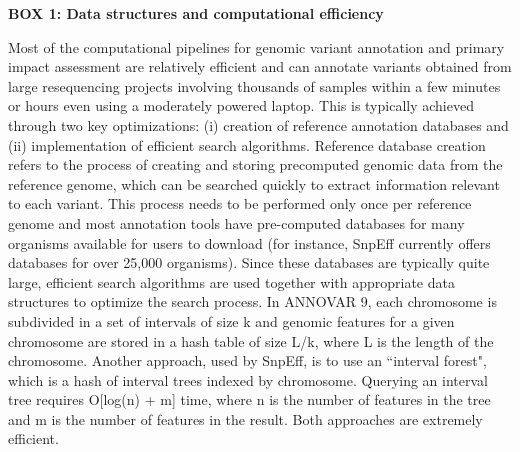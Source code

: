 \textbf{BOX 1: Data structures and computational efficiency}
\begin{framed}
Most of the computational pipelines for genomic variant annotation and primary impact assessment are relatively efficient and can annotate variants obtained from large resequencing projects involving thousands of samples within a few minutes or hours even using a moderately powered laptop. This is typically achieved through two key optimizations: (i) creation of reference annotation databases and (ii) implementation of efficient search algorithms. Reference database creation refers to the process of creating and storing precomputed genomic data from the reference genome, which can be searched quickly to extract information relevant to each variant. This process needs to be performed only once per reference genome and most annotation tools have pre-computed databases for many organisms available for users to download (for instance, SnpEff currently offers databases for over 25,000 organisms). Since these databases are typically quite large, efficient search algorithms are used together with appropriate data structures to optimize the search process. In ANNOVAR 9, each chromosome is subdivided in a set of intervals of size k and genomic features for a given chromosome are stored in a hash table of size L/k, where L is the length of the chromosome. Another approach, used by SnpEff, is to use an ``interval forest", which is a hash of interval trees  \cite{cormen2001introduction} indexed by chromosome. Querying an interval tree requires O[log(n) + m] time, where n is the number of features in the tree and m is the number of features in the result. Both approaches are extremely efficient.
\end{framed}

